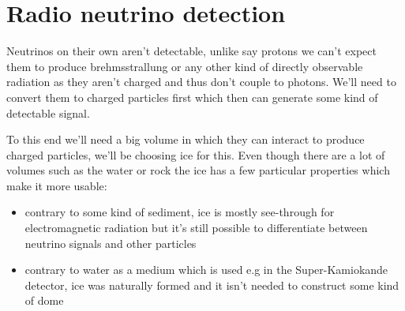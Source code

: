 \documentclass[11pt,a4paper,faculty=we,language=en,doctype=report]{cls/ugent-doc}
\begin{document}
\chapter{Radio neutrino detection}
Neutrinos on their own aren't detectable, unlike say protons we can't expect
them to produce brehmsstrallung or any other kind of directly observable
radiation as they aren't charged and thus don't couple to photons. We'll need
to convert them to charged particles first which then can generate some kind of
detectable signal.  

To this end we'll need a big volume in which they can interact to produce
charged particles, we'll be choosing ice for this.  Even though there are a lot
of volumes such as the water or rock the ice has a few particular properties
which make it more usable:
\begin{itemize}
  \item contrary to some kind of sediment, ice is mostly see-through for electromagnetic radiation but it's still possible
    to differentiate between neutrino signals and other particles
  \item contrary to water as a medium which is used e.g in the Super-Kamiokande detector\cite{SuperKamio}, ice
    was naturally formed and it isn't needed to construct some kind of dome
\end{itemize}
\end{document}
